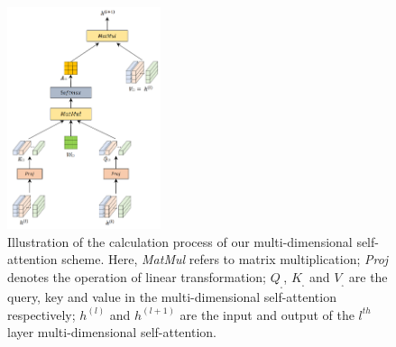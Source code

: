 \begin{figure}[!ht]
    \centering
    \includegraphics[width=0.4\textwidth]{pictures/Multidim_Attention.png}
    \caption{Illustration of the calculation process of our multi-dimensional self-attention scheme. Here, \textit{MatMul} refers to matrix multiplication; \textit{Proj} denotes the operation of linear transformation; $Q_{_\square}$, $K_{_\square}$ and $V_{_\square}$ are the query, key and value in the multi-dimensional self-attention respectively; $h^{(l)}$ and $h^{(l+1)}$ are the input and output of the $l^{th}$ layer multi-dimensional self-attention. }
    \label{fig:multidim_attention}
\end{figure}

